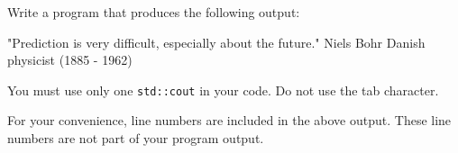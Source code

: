 Write a program that produces the following output:
\begin{console}[numbers=left]
"Prediction is very difficult, 
especially about the future."
    Niels Bohr
    Danish physicist (1885 - 1962)

\end{console}
You must use only one 
\verb!std::cout! in your code. 
Do not use the tab character. 

For your convenience, line numbers are included in the above output.
These line numbers are not part of your program output.
